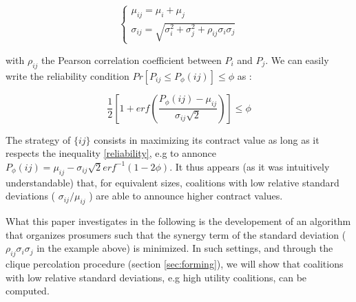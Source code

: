 \documentclass[conference]{IEEEtran}
\begin{document}
\begin{equation}
\left\{ \begin{array}{lll}
		\mu_{ij} = \mu_{i} + \mu_{j} \\
		\sigma_{ij} = \sqrt{\sigma_{i}^{2} + \sigma_{j}^{2} + \rho_{ij}\sigma_{i}\sigma_{j}}
\end{array} \right.
\label{parameters}
\end{equation}

with $ \rho_{ij} $ the Pearson correlation coefficient between $ P_{i} $ and $ P_{j} $. We can easily write the reliability condition $ Pr[P_{ij} \leq P_{\phi}(ij) ] \leq \phi $ as :

\begin{equation}
\dfrac{1}{2} \left[ 1+ erf \left( \dfrac{P_{\phi}(ij) - \mu_{ij}}{\sigma_{ij}\sqrt{2}} \right) \right] \leq \phi
\label{reliability}
\end{equation}

The strategy of $ \{ij\} $ consists in maximizing its contract value as long as it respects the inequality \ref{reliability}, e.g to annonce $ P_{\phi}(ij) = \mu_{ij} - \sigma_{ij}\sqrt{2}erf^{-1}(1-2 \phi ) $. It thus appears (as it was intuitively understandable) that, for equivalent sizes, coalitions with low relative standard deviations ( $ \sigma_{ij} / \mu_{ij} $ ) are able to announce higher contract values. 

What this paper investigates in the following is the developement of an algorithm that organizes prosumers such that the synergy term of the standard deviation ($ \rho_{ij}\sigma_{i}\sigma_{j} $ in the example above) is minimized. In such settings, and through the clique percolation procedure (section \ref{sec:forming}), we will show that coalitions with low relative standard deviations, e.g high utility coalitions, can be computed.
\end{document}
